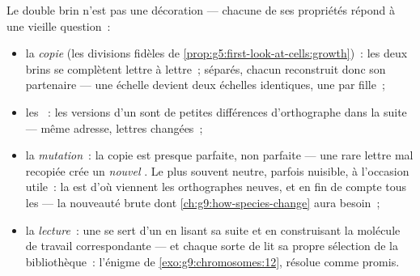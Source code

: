 \begin{proposition}\label{prop:g9:genes-and-dna:explains}
Le double brin n'est pas une décoration --- chacune de ses
propriétés répond à une vieille question~:
\begin{itemize}
  \item la \emph{copie} (les divisions fidèles de
        \cref{prop:g5:first-look-at-cells:growth})~: les
        deux brins se complètent lettre à lettre~; séparés,
        chacun reconstruit donc son partenaire --- une
        échelle devient deux échelles identiques, une par
         fille~;
  \item les \emph{}~: les versions d'un  sont de
        petites différences d'orthographe dans la suite ---
        même adresse, lettres changées~;
  \item la \emph{mutation}~: la copie est
        presque parfaite, non parfaite --- une rare lettre
        mal recopiée crée un \emph{nouvel} . Le plus
        souvent neutre, parfois nuisible, à l'occasion
        utile~: la  est d'où viennent les
        orthographes neuves, et en fin de compte tous les
         --- la nouveauté brute dont
        \cref{ch:g9:how-species-change} aura besoin~;
  \item la \emph{lecture}~: une  se sert d'un 
        en lisant sa suite et en construisant la molécule
        de travail correspondante --- et chaque sorte de
         lit sa propre sélection de la bibliothèque~:
        l'énigme de \cref{exo:g9:chromosomes:12}, résolue
        comme promis.
\end{itemize}
\end{proposition}
\admitted


